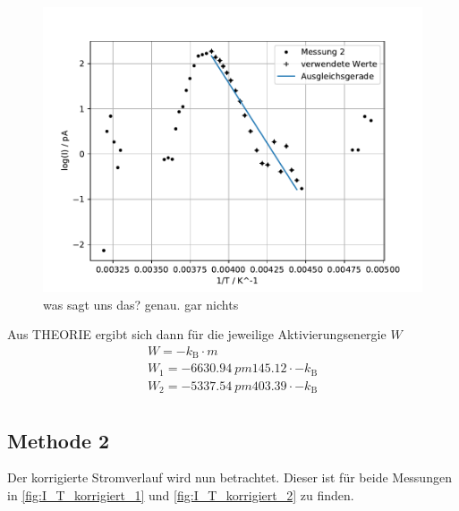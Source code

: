 \begin{figure}
  \centering
  \includegraphics{build/log(I)_1durchT_2.pdf}
  \caption{was sagt uns das? genau. gar nichts}
  \label{fig:log_I_1_durch_T_Messung 2}
\end{figure} %
Aus THEORIE ergibt sich dann für die jeweilige Aktivierungsenergie $W$
\begin{align}
  W = -k_\text{B} \cdot m \\
  W_1 = -6630.94 \ pm 145.12 \cdot -k_\text{B} \\
  W_2 = -5337.54 \ pm 403.39 \cdot -k_\text{B}\\
\end{align}

\subsection{Methode 2}
Der korrigierte Stromverlauf wird nun betrachtet.
Dieser ist für beide Messungen in \autoref{fig:I_T_korrigiert_1} und \autoref{fig:I_T_korrigiert_2} zu finden.

